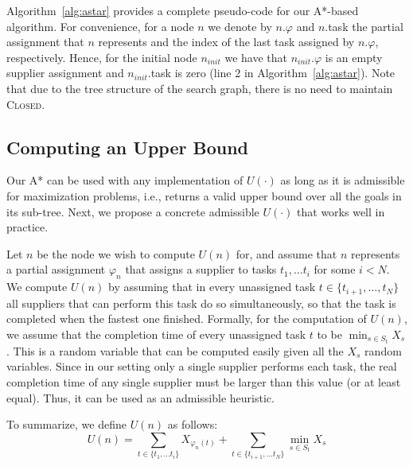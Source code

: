 \documentclass[letterpaper]{article} %
\newcommand{\astar}{\textsc{A*}\xspace}
\newcommand{\closed}{\textsc{Closed}\xspace}
\newcommand\Roni[1]{\nb{\textbf{Roni:}}{blue}{#1}}
\begin{document}
Algorithm~\ref{alg:astar} provides a complete pseudo-code for our \astar-based algorithm. For convenience, for a node $n$ we denote by $n.\varphi$ and $n$.task 
the partial assignment that $n$ represents and the index of the last task assigned by $n.\varphi$, respectively. Hence, for the initial node $n_{init}$ we have that $n_{init}.\varphi$ is an empty supplier assignment and $n_{init}.$task is zero (line 2 in Algorithm~\ref{alg:astar}). Note that due to the tree structure of the search graph, there is no need to maintain \closed.


\subsection{Computing an Upper Bound}

Our \astar can be used with any implementation of $U(\cdot)$ as long as it is admissible for maximization problems, i.e., returns a valid upper bound over all the goals in its sub-tree. Next, we propose a concrete admissible $U(\cdot)$ that works well in practice. 

Let $n$ be the node we wish to compute $U(n)$ for, and assume that $n$ represents a partial assignment $\varphi_n$ that assigns a supplier to tasks $t_1,\ldots t_i$ for some $i<N$. 
We compute $U(n)$ by assuming that in every unassigned task $t\in \{t_{i+1},\ldots,t_{N}\}$ 
all suppliers that can perform this task do so simultaneously, so that the task is completed 
when the fastest one finished. Formally, for the computation of $U(n)$, we assume that the completion time of every unassigned task $t$ to be $\min_{s\in S_t} X_s$. This is a random variable that can be computed easily given all the $X_s$ random variables. Since in our setting only a single supplier performs each task, the real completion time of any single supplier must be larger than this value (or at least equal). Thus, it can be used as an admissible heuristic. 

To summarize, we define $U(n)$ as follows:
\begin{equation}
U(n)=\sum_{t\in \{t_1,\ldots t_i\}} X_{\varphi_n(t)} + \sum_{t\in \{t_{i+1},\ldots t_{N}\}} \min_{s\in S_t} X_s
\label{eq:heuristic}
\end{equation}
 
\end{document}

